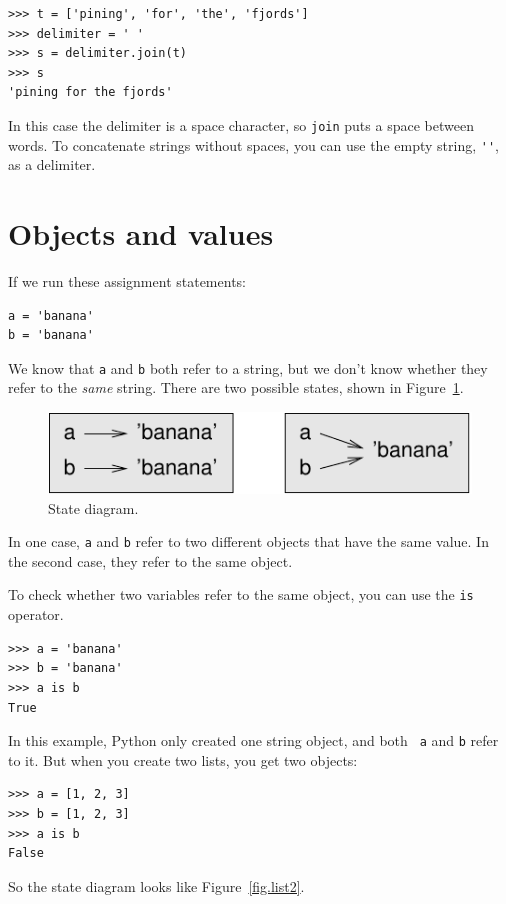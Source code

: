 \documentclass[10pt]{book}
\begin{document}
\begin{verbatim}
>>> t = ['pining', 'for', 'the', 'fjords']
>>> delimiter = ' '
>>> s = delimiter.join(t)
>>> s
'pining for the fjords'
\end{verbatim}
%
In this case the delimiter is a space character, so
{\tt join} puts a space between words.  To concatenate
strings without spaces, you can use the empty string,
\verb"''", as a delimiter. 


\section{Objects and values}
\label{equivalence}

If we run these assignment statements:

\begin{verbatim}
a = 'banana'
b = 'banana'
\end{verbatim}
%
We know that {\tt a} and {\tt b} both refer to a
string, but we don't
know whether they refer to the {\em same} string.
There are two possible states, shown in Figure~\ref{fig.list1}.

\begin{figure}
\centerline
{\includegraphics[scale=0.8]{figs/list1.pdf}}
\caption{State diagram.}
\label{fig.list1}
\end{figure}

In one case, {\tt a} and {\tt b} refer to two different objects that
have the same value.  In the second case, they refer to the same
object.

To check whether two variables refer to the same object, you can
use the {\tt is} operator.

\begin{verbatim}
>>> a = 'banana'
>>> b = 'banana'
>>> a is b
True
\end{verbatim}
%
In this example, Python only created one string object, and both {\tt
  a} and {\tt b} refer to it.  But when you create two lists, you get
two objects:

\begin{verbatim}
>>> a = [1, 2, 3]
>>> b = [1, 2, 3]
>>> a is b
False
\end{verbatim}
%
So the state diagram looks like Figure~\ref{fig.list2}.
\end{document}
